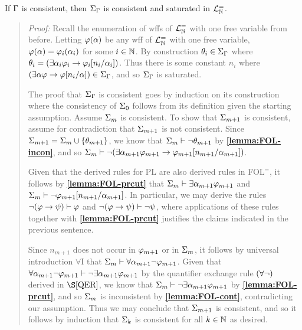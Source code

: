 \begin{Lthm} \label{lemma:FOL-sat}
  If $\Gamma$ is consistent, then $\Sigma_{\Gamma}$ is consistent and saturated in $\mathcal{L}^{=}_{\mathbb{N}}$. 
\end{Lthm}

\begin{quote} 
  \textit{Proof:} 
  Recall the enumeration of wffs of $\mathcal{L}^{=}_{\mathbb{N}}$ with one free variable from before. 
  Letting $\varphi(\alpha)$ be any wff of $\mathcal{L}^{=}_{\mathbb{N}}$ with one free variable, $\varphi(\alpha)=\varphi_i(\alpha_i)$ for some $i\in\mathbb{N}$.
  By construction $\theta_i\in\Sigma_{\Gamma}$ where $\theta_i=(\exists \alpha_i\varphi_i \rightarrow \varphi_i[n_i/\alpha_i])$.
  Thus there is some constant $n_i$ where $(\exists \alpha\varphi \rightarrow \varphi[n_i/\alpha])\in\Sigma_{\Gamma}$, and so $\Sigma_{\Gamma}$ is saturated. 

  The proof that $\Sigma_{\Gamma}$ is consistent goes by induction on its construction where the consistency of $\Sigma_0$ follows from its definition given the starting assumption.
  Assume $\Sigma_m$ is consistent.
  To show that $\Sigma_{m+1}$ is consistent, assume for contradiction that $\Sigma_{m+1}$ is not consistent.
  Since $\Sigma_{m+1}=\Sigma_m\cup\lbrace\theta_{m+1}\rbrace$, we know that $\Sigma_m\vdash \neg\theta_{m+1}$ by \textbf{\ref{lemma:FOL-incon}}, and so $\Sigma_m\vdash\neg(\exists \alpha_{m+1}\varphi_{m+1}\rightarrow \varphi_{m+1}[n_{m+1}/\alpha_{m+1}])$.

  Given that the derived rules for PL are also derived rules in FOL$^=$, it follows by \textbf{\ref{lemma:FOL-prcut}} that $\Sigma_m\vdash \exists \alpha_{m+1}\varphi_{m+1}$ and $\Sigma_m\vdash\neg\varphi_{m+1}[n_{m+1}/\alpha_{m+1}]$.
  In particular, we may derive the rules $\neg(\varphi \rightarrow \psi) \vdash \varphi$ and $\neg(\varphi \rightarrow \psi) \vdash \neg\psi$, where applications of these rules together with \textbf{\ref{lemma:FOL-prcut}} justifies the claims indicated in the previous sentence.

  Since $n_{m+1}$ does not occur in $\varphi_{m+1}$ or in $\Sigma_m$, it follows by universal introduction $\forall$I that $\Sigma_m\vdash \forall \alpha_{m+1}\neg\varphi_{m+1}$.
  Given that $\forall \alpha_{m+1}\neg\varphi_{m+1} \vdash \neg\exists \alpha_{m+1}\varphi_{m+1}$ by the quantifier exchange rule $(\forall\neg)$ derived in $\S\ref{QER}$, we know that $\Sigma_m \vdash \neg\exists \alpha_{m+1}\varphi_{m+1}$ by \textbf{\ref{lemma:FOL-prcut}}, and so $\Sigma_m$ is inconsistent by \textbf{\ref{lemma:FOL-cont}}, contradicting our assumption. 
  Thus we may conclude that $\Sigma_{m+1}$ is consistent, and so it follows by induction that $\Sigma_k$ is consistent for all $k\in\mathbb{N}$ as desired.


\end{quote}
